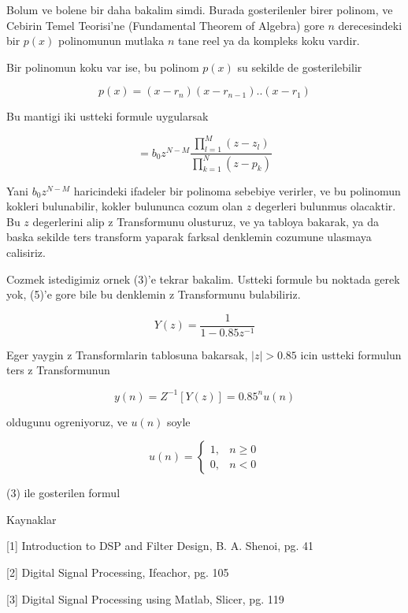 \documentclass[12pt,fleqn]{article}
\begin{document}
Bolum ve bolene bir daha bakalim simdi. Burada gosterilenler birer polinom,
ve Cebirin Temel Teorisi'ne (Fundamental Theorem of Algebra) gore $n$
derecesindeki bir $p(x)$ polinomunun mutlaka $n$ tane reel ya da kompleks
koku vardir. 

Bir polinomun koku var ise, bu polinom $p(x)$ su sekilde de gosterilebilir

\[ p(x) = (x-r_n)(x-r_{n-1})..(x-r_1) \]

Bu mantigi iki ustteki formule uygularsak 

\[ = b_0 z^{N - M} 
\frac{\prod_{l=1}^{M}(z-z_l)}{ \prod_{k=1}^{N}(z-p_k) }
\]

Yani $b_0z^{N-M}$ haricindeki ifadeler bir polinoma sebebiye verirler, ve
bu polinomun kokleri bulunabilir, kokler bulununca cozum olan $z$ degerleri
bulunmus olacaktir. Bu $z$ degerlerini alip z Transformunu olusturuz, ve ya
tabloya bakarak, ya da baska sekilde ters transform yaparak farksal
denklemin cozumune ulasmaya calisiriz. 

Cozmek istedigimiz ornek (3)'e tekrar bakalim. Ustteki formule bu noktada
gerek yok, (5)'e gore bile bu denklemin z Transformunu bulabiliriz. 

\[ Y(z) = \frac{1}{1-0.85z^{-1}} \]

Eger yaygin z Transformlarin tablosuna bakarsak, $|z|>0.85$ icin ustteki
formulun ters z Transformunun 

\[ y(n) = Z^{-1} [Y(z)] = 0.85^nu(n) \]

oldugunu ogreniyoruz, ve $u(n)$ soyle 

\[ u(n) = 
\left\{ \begin{array}{ll}
1, & n \ge 0\\
0, & n < 0
\end{array} \right.
 \]

(3) ile gosterilen formul 






Kaynaklar

[1] Introduction to DSP and Filter Design, B. A. Shenoi, pg. 41

[2] Digital Signal Processing, Ifeachor, pg. 105

[3] Digital Signal Processing using Matlab, Slicer, pg. 119
\end{document}
